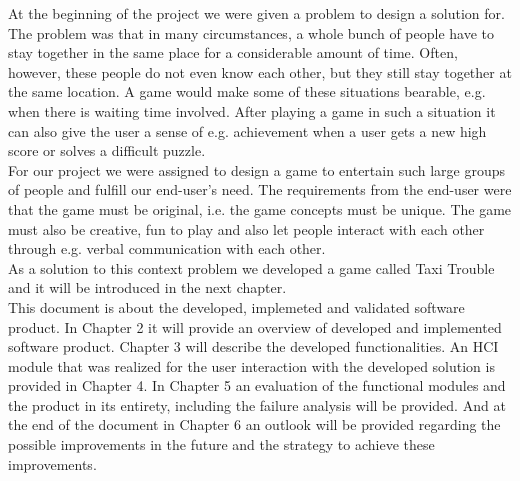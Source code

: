 At the beginning of the project we were given a problem to design a solution for. The problem was that in many
circumstances, a whole bunch of people have to stay together in the same place for a considerable amount of
time. Often, however, these people do not even know each other, but they still stay together at the same location. A game would make some of these situations bearable, e.g. when there is waiting time involved. After playing a game in such a situation it can also give the user a sense of e.g. achievement when a user gets a new high score or solves a difficult puzzle. \\
For our project we were assigned to design a game to entertain such large groups of people and fulfill our end-user's need. The requirements from the end-user were that the game must be original, i.e. the game concepts must be unique. The game must also be creative, fun to play and also let people interact with each other through e.g. verbal communication with each other. \\
As a solution to this context problem we developed a game called Taxi Trouble and it will be introduced in the next chapter. \\
\newline
This document is about the developed, implemeted and validated software product. In Chapter 2 it will provide an overview of developed and implemented software product. Chapter 3 will describe the developed functionalities. An HCI module that was realized for the user interaction with the developed solution is provided in Chapter 4.  In Chapter 5 an evaluation of the functional modules and the product in its entirety, including the failure analysis will be provided. And at the end of the document in Chapter 6 an outlook will be provided regarding the possible improvements in the future and the strategy to achieve these improvements.
